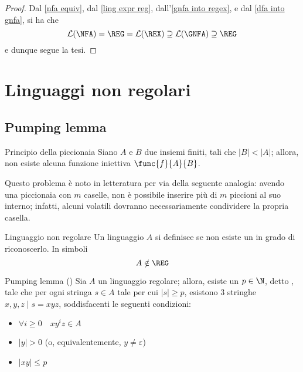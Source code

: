 \documentclass[a4paper, 12pt]{report}
\begin{document}
    \begin{proof}
        Dal \cref{nfa equiv}, dal \cref{ling expr reg}, dall'\cref{gnfa into regex}, e dal \cref{dfa into gnfa}, si ha che $$\mathcal{L}(\NFA) = \mathrm{\REG} = \mathcal{L}(\REX) \supseteq \mathcal{L}(\mathrm{\GNFA}) \supseteq \mathrm{\REG}$$ e dunque segue la tesi.
    \end{proof}

    \section{Linguaggi non regolari}

    \subsection{Pumping lemma}

    \begin{framedprinc}[label={pigeonhole}]{Principio della piccionaia}
        Siano $A$ e $B$ due insiemi finiti, tali che $|B| < |A|$; allora, non esiste alcuna funzione iniettiva $\func{f}{A}{B}$.

        Questo problema è noto in letteratura  per via della seguente analogia: avendo una piccionaia con $m$ caselle, non è possibile inserire più di $m$ piccioni al suo interno; infatti, alcuni volatili dovranno necessariamente condividere la propria casella.
    \end{framedprinc}
    
    \begin{frameddefn}{Linguaggio non regolare}
        Un linguaggio $A$ si definisce  se non esiste un \DFA in grado di riconoscerlo. In simboli $$A \notin \mathrm{\REG}$$
    \end{frameddefn}

    \begin{framedlem}[label={pumping reg}]{Pumping lemma (\REG)}
        Sia $A$ un linguaggio regolare; allora, esiste un $p \in \N$, detto , tale che per ogni stringa $s \in A$ tale per cui $|s| \ge p$, esistono 3 stringhe $x, y, z \mid s = xyz$, soddisfacenti le seguenti condizioni:

        \begin{itemize}
            \item $\forall i \ge 0 \quad xy^iz \in A$
            \item $|y| > 0$ (o, equivalentemente, $y \neq \varepsilon$)
            \item $|xy| \le p$
        \end{itemize}
    \end{framedlem}
\end{document}
